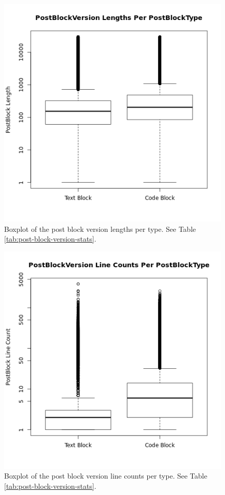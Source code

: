 \documentclass[a4paper,11pt, notitlepage]{report}
\theoremstyle{definition}
\numberwithin{equation}{section}		%
\begin{document}
\begin{figure}[ht]
    \centering
    \includegraphics[width=6in]{figures/post_block_version_length_boxplot.png}
    \caption{Boxplot of the post block version lengths per type. See Table \ref{tab:post-block-version-stats}.}
    \label{fig:post-block-version-length-boxplot}
\end{figure}

\begin{figure}[ht]
    \centering
    \includegraphics[width=6in]{figures/post_block_version_linecount_boxplot.png}
    \caption{Boxplot of the post block version line counts per type. See Table \ref{tab:post-block-version-stats}.}
    \label{fig:post-block-version-linecount-boxplot}
\end{figure}
\end{document}
